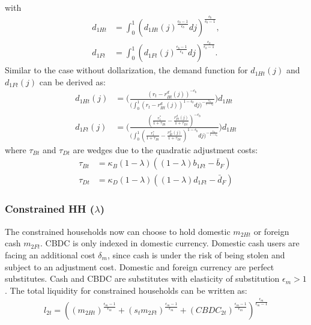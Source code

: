 \documentclass[12pt]{article}
\begin{document}
with 
\begin{align*}
d_{1Ht} &= \int_0^1({d_{1Ht}(j)}^{\frac{\epsilon_b-1}{\epsilon_b}}dj)^{\frac{\epsilon_b}{\epsilon_b-1}}, \\
d_{1Ft} &= \int_0^1({d_{1Ft}(j)}^{\frac{\epsilon_b-1}{\epsilon_b}}dj)^{\frac{\epsilon_b}{\epsilon_b-1}}.
\end{align*}
Similar to the case without dollarization, the demand function for $d_{1Ht}(j)$  and $d_{1Ft}(j)$ can be derived as:
\begin{align*}
d_{1Ht}(j) &= \Biggl(\frac{(r_t-r_{Ht}^d(j))^{-\epsilon_b}}{\big(\int_0^1(r_t-r_{Ht}^d(j))^{1-\epsilon_b}dj\big)^{-\frac{\epsilon_b}{1-\epsilon_b}}}\Biggl)d_{1Ht} \\
d_{1Ft}(j) &= \Biggl(\frac{(\frac{r_t^*}{1+\tau_{Bt}}-\frac{r_{Ft}^d(j)}{1+\tau_{Dt}})^{-\epsilon_b}}{\big(\int_0^1(\frac{r_t^*}{1+\tau_{Bt}}-\frac{r_{Ft}^d(j)}{1+\tau_{Dt}})^{1-\epsilon_b}dj\big)^{-\frac{\epsilon_b}{1-\epsilon_b}}}\Biggl)d_{1Ht}
\end{align*}
where $\tau_{Bt}$ and $\tau_{Dt}$ are wedges due to the quadratic adjustment costs: 
\begin{align*}
\tau_{Bt} &= \kappa_B(1-\lambda)((1-\lambda)b_{1Ft}-\bar{b}_F) \\
\tau_{Dt} &= \kappa_D(1-\lambda)((1-\lambda)d_{1Ft}-\bar{d}_F)
\end{align*}

\subsubsection*{Constrained HH  ($\lambda$)}
The constrained households now can choose to hold domestic $m_{2Ht}$ or foreign cash $m_{2Ft}$. CBDC is only indexed in domestic currency. 
Domestic cash users are facing an additional cost $\delta_m$, since cash is under the risk of being stolen and subject to an adjustment cost. Domestic and foreign currency are perfect substitutes. Cash and CBDC are substitutes with elasticity of substitution $\epsilon_m>1$ . The total liquidity for constrained households can be written as: 
\begin{align*}
l_{2t} = ((m_{2Ht})^{\frac{\epsilon_m-1}{\epsilon_m}}+(s_t m_{2Ft})^{\frac{\epsilon_m-1}{\epsilon_m}}+(CBDC_{2t})^{\frac{\epsilon_m-1}{\epsilon_m}})^{\frac{\epsilon_m}{\epsilon_m-1}}
\end{align*}
\end{document}
